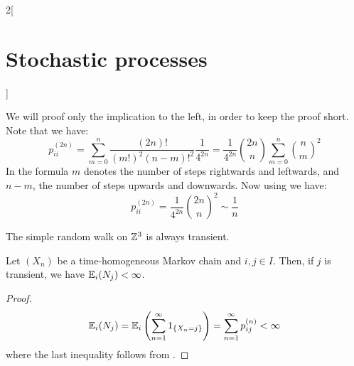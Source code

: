 \documentclass[../../../main_math.tex]{subfiles}
\begin{document}
\begin{multicols}{2}[\section{Stochastic processes}]
\begin{theorem}
  \end{theorem}
  \begin{sproof}
    We will proof only the implication to the left, in order to keep the proof short. Note that we have:
    $$
      p_{ii}^{(2n)}=\sum_{m=0}^{n}\frac{(2n)!}{{(m!)}^2{(n-m)!}^2}\frac{1}{4^{2n}}=\frac{1}{4^{2n}}\binom{2n}{n}\sum_{m=0}^n \binom{n}{m}^2
    $$
    In the formula $m$ denotes the number of steps rightwards and leftwards, and $n-m$, the number of steps upwards and downwards. Now using  we have:
    $$
      p_{ii}^{(2n)}=\frac{1}{4^{2n}}\binom{2n}{n}^2\sim \frac{1}{n}
    $$
  \end{sproof}
  \begin{theorem}
    The simple random walk on $\mathbb{Z}^3$ is always transient.
  \end{theorem}
  \begin{corollary}
    Let $(X_n)$ be a time-homogeneous Markov chain and $i,j\in I$. Then, if $j$ is transient, we have $\mathbb{E}_i(N_j)<\infty$.
  \end{corollary}
  \begin{proof}
    $$
      \mathbb{E}_i(N_j)=\mathbb{E}_i\left(\sum_{n=1}^{\infty}1_{\{X_n=j\}}\right)=\sum_{n=1}^{\infty}p_{ij}^{(n)}<\infty
    $$
    where the last inequality follows from .
  \end{proof}

\end{multicols}
\end{document}
